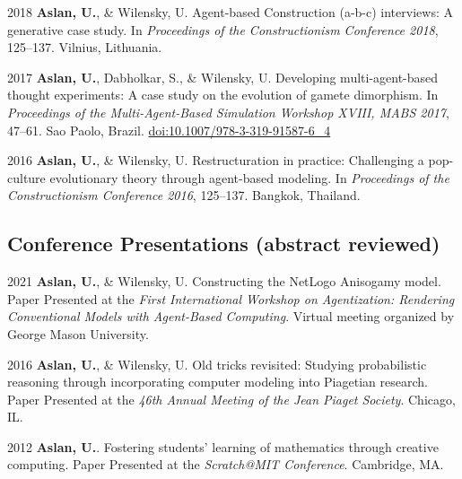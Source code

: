 \documentclass[11pt,letterpaper]{report} %
\begin{document}
\begin{tablist}
        \item[2018] \tab{}\textbf{Aslan, U.}, \& Wilensky, U. Agent-based Construction (a-b-c) interviews: A generative case study. In \textit{Proceedings of the Constructionism Conference 2018}, 125--137. Vilnius, Lithuania.

        \item[2017] \tab{}\textbf{Aslan, U.}, Dabholkar, S., \& Wilensky, U. Developing multi-agent-based thought experiments: A case study on the evolution of gamete dimorphism. In \textit{Proceedings of the Multi-Agent-Based Simulation Workshop XVIII, MABS 2017}, 47--61. Sao Paolo, Brazil. \href{https://doi.org/10.1007/978-3-319-91587-6\_4}{doi:10.1007/978-3-319-91587-6\_4}

        \item[2016] \tab{}\textbf{Aslan, U.}, \& Wilensky, U. Restructuration in practice: Challenging a pop-culture evolutionary theory through agent-based modeling. In \textit{Proceedings of the Constructionism Conference 2016}, 125--137. Bangkok, Thailand.


    \end{tablist}

    \subsection*{Conference Presentations (abstract reviewed)}

    \begin{tablist}

        \item[2021] \tab{}\textbf{Aslan, U.}, \& Wilensky, U. Constructing the NetLogo Anisogamy model. Paper Presented at the \textit{First International Workshop on Agentization: Rendering Conventional Models with Agent-Based Computing}. Virtual meeting organized by George Mason University.

        \item[2016] \tab{}\textbf{Aslan, U.}, \& Wilensky, U. Old tricks revisited: Studying probabilistic reasoning through incorporating computer modeling into Piagetian research. Paper Presented at the \textit{46th Annual Meeting of the Jean Piaget Society}. Chicago, IL.

        \item[2012] \tab{}\textbf{Aslan, U.}. Fostering students' learning of mathematics through creative computing. Paper Presented at the \textit{Scratch@MIT Conference}. Cambridge, MA.

    \end{tablist}
\end{document}
